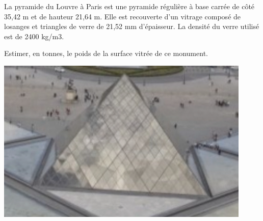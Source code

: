 
\begin{minipage}{0.58\linewidth}


La pyramide du Louvre à Paris est une pyramide régulière à base carrée de côté 35,42 m et de
hauteur 21,64 m. Elle est recouverte d’un vitrage composé de losanges et triangles de verre de
21,52 mm d’épaisseur. La densité du verre utilisé est de 2400 kg/m3.

\medskip

Estimer, en tonnes, le poids de la surface vitrée de ce monument.
\end{minipage}
\hfill
\begin{minipage}{0.38\linewidth}
\includegraphics[scale=0.5]{RepS-pyramide_louvre.png} 
\end{minipage}

